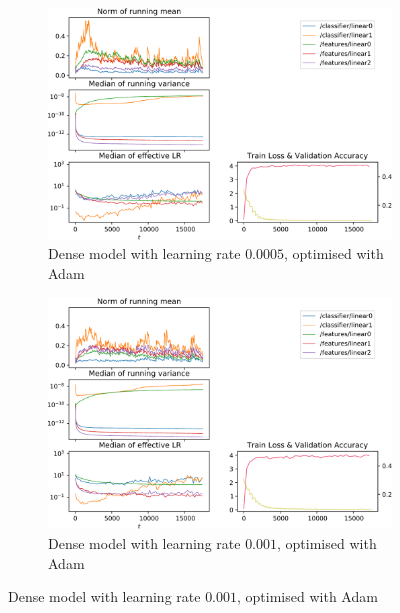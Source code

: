 \begin{figure}
    \begin{subfigure}{\textwidth}
        \centering
        \includegraphics[width=\linewidth]{gfx/diagrams/experiments/adam/fullyconnectedmodel_adam_00005_0_-1.pdf}
        \caption{Dense model with learning rate $0.0005$, optimised with Adam}
    \end{subfigure}

    \begin{subfigure}{\textwidth}
        \centering
        \includegraphics[width=\linewidth]{gfx/diagrams/experiments/adam/fullyconnectedmodel_adam_0001_0_-1.pdf}
        \caption{Dense model with learning rate $0.001$, optimised with Adam}
    \end{subfigure}


\end{figure}

